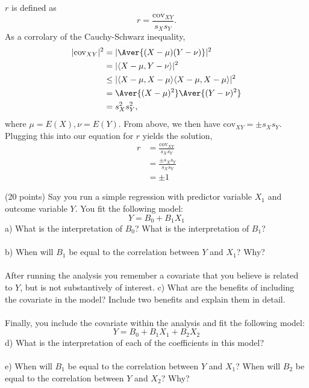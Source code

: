\documentclass[onecolumn,10pt]{jhwhw}
\begin{document}
$r$ is defined as
$$r = \frac{\mbox{cov}_{XY}}{s_X s_Y}.$$
As a corrolary of the Cauchy-Schwarz inequality,
\begin{align*}
|\mbox{cov}_{XY}|^2 & =  |\Aver{(X-\mu)(Y-\nu)}|^2           \\
                    & =  |\langle X-\mu,Y-\nu \rangle|^2               \\
                    & \leq  |\langle X-\mu,X-\mu \rangle\langle X-\mu,X-\mu \rangle|^2  \\
                    & =  \Aver{(X-\mu)^2}\Aver{(Y-\nu)^2}        \\
                    & =  s_X^2 s_Y^2,
\end{align*}
where $\mu=E(X), \nu=E(Y)$. From above, we then have $\mbox{cov}_{XY} = \pm s_X s_Y$. Plugging this into our equation for $r$ yields the solution,
\begin{align*}
r &= \frac{\mbox{cov}_{XY}}{s_X s_Y} \\
  &= \frac{\pm s_X s_Y}{s_X s_Y} \\
  &= \pm 1
\end{align*}

\clearpage
\problem{}
(20 points) Say you run a simple regression with predictor variable $X_1$ and outcome variable $Y$. You fit the following model:
                $$Y = B_0 + B_1 X_1$$
a) What is the interpretation of $B_0$? What is the interpretation of $B_1$?\\
\\
b) When will $B_1$ be equal to the correlation between $Y$ and $X_1$? Why?\\
\\
After running the analysis you remember a covariate that you believe is related to $Y$, but is not substantively of interest.
c) What are the benefits of including the covariate in the model? Include two benefits and explain them in detail.\\
\\
Finally, you include the covariate within the analysis and fit the following model:
                $$Y = B_0 + B_1 X_1 + B_2 X_2$$
d) What is the interpretation of each of the coefficients in this model?\\
\\
e) When will $B_1$ be equal to the correlation between $Y$ and $X_1$? When will $B_2$ be equal to the correlation between $Y$ and $X_2$? Why?
\end{document}
